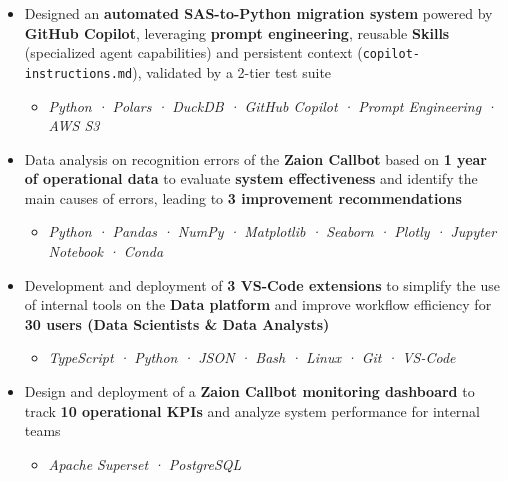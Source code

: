 \documentclass[10pt,english,french]{article}
\begin{document}
\begin{itemize}[leftmargin=0.5cm, label=\textbullet, itemsep=0.0625em]
    \item Designed an \textbf{automated SAS-to-Python migration system} powered
          by \textbf{GitHub Copilot}, leveraging \textbf{prompt engineering},
          reusable \textbf{Skills} (specialized agent capabilities) and persistent
          context (\texttt{copilot-instructions.md}), validated by a 2-tier test suite
          \begin{itemize}[leftmargin=0.25cm,label=\textendash,itemsep=0em,topsep=0.2em]
              \item \textit{\fontsize{10pt}{9pt}\selectfont Python · Polars · DuckDB · GitHub Copilot · Prompt Engineering · AWS S3}
          \end{itemize}

    \item Data analysis on recognition errors of the \textbf{Zaion Callbot} based on
          \textbf{1 year of operational data} to evaluate \textbf{system effectiveness}
          and identify the main causes of errors, leading to \textbf{3 improvement
              recommendations}
          \begin{itemize}[leftmargin=0.25cm,label=\textendash,itemsep=0em,topsep=0.2em]
              \item \textit{\fontsize{10pt}{9pt}\selectfont Python · Pandas · NumPy · Matplotlib · Seaborn · Plotly · Jupyter Notebook · Conda}
          \end{itemize}

    \item Development and deployment of \textbf{3 VS-Code extensions} to simplify the use
          of internal tools on the \textbf{Data platform} and improve workflow efficiency
          for \textbf{30\raisebox{0.20ex}{\small +} users (Data Scientists \& Data
              Analysts)}
          \begin{itemize}[leftmargin=0.25cm,label=\textendash,itemsep=0em,topsep=0.2em]
              \item \textit{\fontsize{10pt}{9pt}\selectfont TypeScript · Python · JSON · Bash · Linux · Git · VS-Code}
          \end{itemize}

    \item Design and deployment of a \textbf{Zaion Callbot monitoring dashboard} to track
          \textbf{10\raisebox{0.20ex}{\small +} operational KPIs} and analyze system
          performance for internal teams
          \begin{itemize}[leftmargin=0.25cm,label=\textendash,itemsep=0em,topsep=0.2em]
              \item \textit{\fontsize{10pt}{9pt}\selectfont Apache Superset · PostgreSQL}
          \end{itemize}


\end{itemize}
\end{document}
